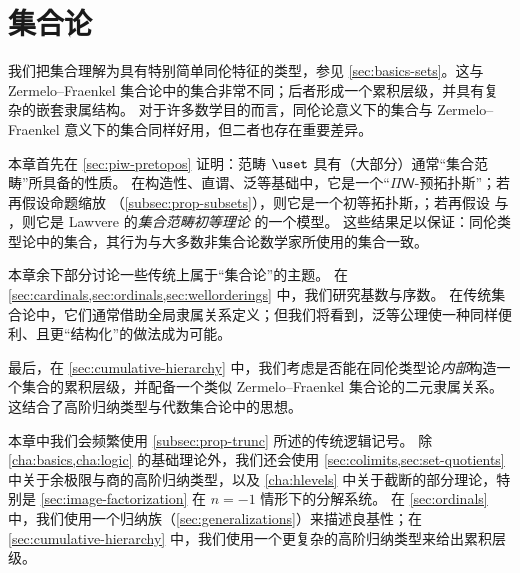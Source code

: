 \chapter{集合论}
\label{cha:set-math}

%

我们把集合理解为具有特别简单同伦特征的类型，参见
\cref{sec:basics-sets}。这与 Zermelo--Fraenkel 集合论中的集合非常不同；后者形成一个累积层级，并具有复杂的嵌套隶属结构。
对于许多数学目的而言，同伦论意义下的集合与
Zermelo--Fraenkel 意义下的集合同样好用，但二者也存在重要差异。

本章首先在 \cref{sec:piw-pretopos} 证明：范畴 $\uset$ 具有（大部分）通常“集合范畴”所具备的性质。
%
%
在构造性、直谓、泛等基础中，它是一个“$\Pi\mathsf{W}$-预拓扑斯”；若再假设命题缩放
%
（\cref{subsec:prop-subsets}），则它是一个初等拓扑斯，；若再假设 \LEM{} 与 \choice{}，则它是 Lawvere 的\emph{集合范畴初等理论} 的一个模型。
%
这些结果足以保证：同伦类型论中的集合，其行为与大多数非集合论数学家所使用的集合一致。

本章余下部分讨论一些传统上属于“集合论”的主题。
在 \cref{sec:cardinals,sec:ordinals,sec:wellorderings} 中，我们研究基数与序数。
在传统集合论中，它们通常借助全局隶属关系定义；但我们将看到，泛等公理使一种同样便利、且更“结构化”的做法成为可能。

最后，在 \cref{sec:cumulative-hierarchy} 中，我们考虑是否能在同伦类型论\emph{内部}构造一个集合的累积层级，并配备一个类似 Zermelo--Fraenkel 集合论的二元隶属关系。
这结合了高阶归纳类型与代数集合论中的思想。
%
%

本章中我们会频繁使用 \cref{subsec:prop-trunc} 所述的传统逻辑记号。
除 \cref{cha:basics,cha:logic} 的基础理论外，我们还会使用 \cref{sec:colimits,sec:set-quotients} 中关于余极限与商的高阶归纳类型，以及 \cref{cha:hlevels} 中关于截断的部分理论，特别是 \cref{sec:image-factorization} 在 $n=-1$ 情形下的分解系统。
在 \cref{sec:ordinals} 中，我们使用一个归纳族（\cref{sec:generalizations}）来描述良基性；在 \cref{sec:cumulative-hierarchy} 中，我们使用一个更复杂的高阶归纳类型来给出累积层级。


